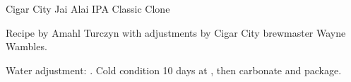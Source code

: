\begin{recipe}{Cigar City Jai Alai IPA Classic Clone}

\begin{aboutblock}
Recipe by Amahl Turczyn with adjustments by Cigar City brewmaster Wayne
Wambles. 
\end{aboutblock}


\begin{methodandtiming}
 
\begin{mashsteps}
\end{mashsteps}

\begin{fermentationsteps}
\end{fermentationsteps}

\begin{directions}
Water adjustment: . Cold condition
10 days at , then carbonate and package.
\end{directions}

\end{methodandtiming}

\recipebreak

\begin{ingredientsblock}

\begin{malts}
\end{malts}

\begin{hops}
\end{hops}


\end{ingredientsblock}

\end{recipe}

